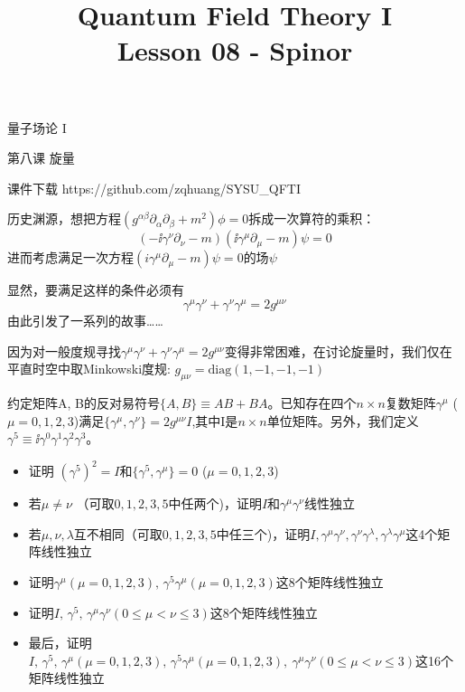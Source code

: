 \documentclass[CJK]{beamer}
\title{Quantum Field Theory I \\ Lesson 08 - Spinor}
\author{}
\date{}
\begin{document}
\begin{frame}
 
\begin{center}
\begin{Large}
\bch
量子场论 I 

{\vskip 0.3in}

第八课 旋量

\ech
\end{Large}
\end{center}

\vskip 0.2in

\bch
课件下载
\ech
https://github.com/zqhuang/SYSU\_QFTI

\end{frame}


\begin{frame}
\bch
历史渊源，想把方程$(g^{\alpha\beta}\partial_\alpha\partial_\beta + m^2)\phi = 0$拆成一次算符的乘积：
$$(-\ii\gamma^\nu\partial_\nu - m)(\ii \gamma^\mu\partial_\mu - m)\psi = 0$$
进而考虑满足一次方程$(i\gamma^\mu\partial_\mu - m)\psi = 0$的场$\psi$

\skipline
显然，要满足这样的条件必须有
$$\gamma^\mu\gamma^\nu + \gamma^\nu\gamma^\mu = 2g^{\mu\nu}$$
由此引发了一系列的故事……
\ech
\end{frame}


\begin{frame}
\bch
因为对一般度规寻找$\gamma^\mu\gamma^\nu + \gamma^\nu\gamma^\mu = 2g^{\mu\nu}$变得非常困难，在讨论旋量时，我们仅在平直时空中取Minkowski度规:
$g_{\mu\nu} = \mathrm{diag}(1, -1, -1, -1)$
\ech

\end{frame}

\begin{frame}
\bch

约定矩阵A, B的反对易符号$\{A, B\}\equiv AB + BA$。已知存在四个$n\times n$复数矩阵$\gamma^\mu$ ($\mu = 0, 1, 2, 3$)满足$\{\gamma^\mu,\gamma^\nu\} = 2g^{\mu\nu}I$,其中I是$n\times n $单位矩阵。另外，我们定义$\gamma^5\equiv \ii\gamma^0\gamma^1\gamma^2\gamma^3$。
\begin{itemize}
\item{证明 $(\gamma^5)^2 = I$和$\{\gamma^5,\gamma^\mu\} = 0$ ($\mu = 0,1,2,3$)}
\item{若$\mu\ne \nu$ （可取$0,1,2,3,5$中任两个)，证明$I$和$\gamma^\mu\gamma^\nu$线性独立}
\item{若$\mu,\nu,\lambda$互不相同（可取$0,1,2,3,5$中任三个)，证明$I,\gamma^\mu\gamma^\nu,\gamma^\nu\gamma^\lambda,\gamma^\lambda\gamma^\mu$这4个矩阵线性独立}
\item{证明$\gamma^\mu (\mu = 0,1,2,3),\, \gamma^5\gamma^\mu (\mu = 0,1,2,3)$这8个矩阵线性独立}
\item{证明$I,\, \gamma^5,\,  \gamma^\mu\gamma^\nu (0\le \mu<\nu\le 3)$这8个矩阵线性独立}
\item{最后，证明 $I,\, \gamma^5,\, \gamma^\mu(\mu=0,1,2,3),\, \gamma^5\gamma^\mu(\mu=0,1,2,3),\ \gamma^\mu\gamma^\nu (0\le \mu<\nu\le 3)$这16个矩阵线性独立}
\end{itemize}

\ech
\end{frame}
\end{document}

